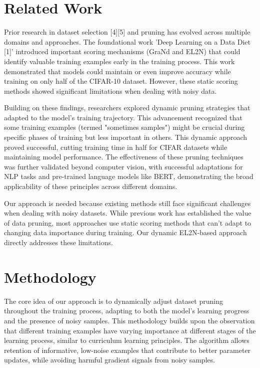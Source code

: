 \documentclass{article}
\begin{document}
\section{Related Work}

Prior research in dataset selection [4][5] and pruning has evolved across multiple domains and approaches. The foundational work 'Deep Learning on a Data Diet [1]' introduced important scoring mechanisms (GraNd and EL2N) that could identify valuable training examples early in the training process. This work demonstrated that models could maintain or even improve accuracy while training on only half of the CIFAR-10 dataset. However, these static scoring methods showed significant limitations when dealing with noisy data.

Building on these findings, researchers explored dynamic pruning strategies that adapted to the model's training trajectory. This advancement recognized that some training examples (termed "sometimes samples") might be crucial during specific phases of training but less important in others. This dynamic approach proved successful, cutting training time in half for CIFAR datasets while maintaining model performance. The effectiveness of these pruning techniques was further validated beyond computer vision, with successful adaptations for NLP tasks and pre-trained language models like BERT, demonstrating the broad applicability of these principles across different domains.

Our approach is needed because existing methods still face significant challenges when dealing with noisy datasets. While previous work has established the value of data pruning, most approaches use static scoring methods that can't adapt to changing data importance during training. Our dynamic EL2N-based approach directly addresses these limitations.

\section{Methodology}

The core idea of our approach is to dynamically adjust dataset pruning throughout the training process, adapting to both the model's learning progress and the presence of noisy samples. This methodology builds upon the observation that different training examples have varying importance at different stages of the learning process, similar to curriculum learning principles. The algorithm allows retention of informative, low-noise examples that contribute to better parameter updates, while avoiding harmful gradient signals from noisy samples.
\end{document}
